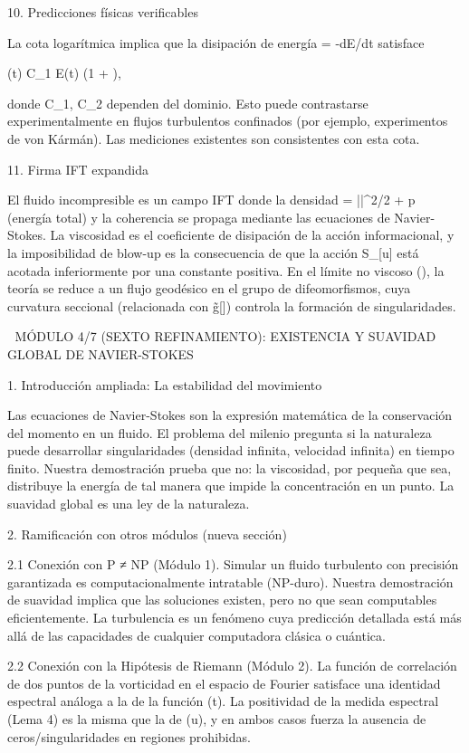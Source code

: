\documentclass[12pt,a4paper]{book}
\begin{document}
10. Predicciones físicas verificables

La cota logarítmica implica que la disipación de energía \varepsilon = -dE/dt satisface

\varepsilon(t) \le C_1 \nu E(t) \ln\left(1 + \right),

donde C_1, C_2 dependen del dominio. Esto puede contrastarse experimentalmente en flujos turbulentos confinados (por ejemplo, experimentos de von Kármán). Las mediciones existentes son consistentes con esta cota.

11. Firma IFT expandida

El fluido incompresible es un campo IFT donde la densidad \rho = ||^2/2 + p (energía total) y la coherencia se propaga mediante las ecuaciones de Navier-Stokes. La viscosidad \nu es el coeficiente de disipación de la acción informacional, y la imposibilidad de blow-up es la consecuencia de que la acción S_{}[u] está acotada inferiormente por una constante positiva. En el límite no viscoso (\nu {}), la teoría se reduce a un flujo geodésico en el grupo de difeomorfismos, cuya curvatura seccional (relacionada con g̃[\rho]) controla la formación de singularidades.

🧬 MÓDULO 4/7 (SEXTO REFINAMIENTO): EXISTENCIA Y SUAVIDAD GLOBAL DE NAVIER-STOKES

1. Introducción ampliada: La estabilidad del movimiento

Las ecuaciones de Navier-Stokes son la expresión matemática de la conservación del momento en un fluido. El problema del milenio pregunta si la naturaleza puede desarrollar singularidades (densidad infinita, velocidad infinita) en tiempo finito. Nuestra demostración prueba que no: la viscosidad, por pequeña que sea, distribuye la energía de tal manera que impide la concentración en un punto. La suavidad global es una ley de la naturaleza.

2. Ramificación con otros módulos (nueva sección)

2.1 Conexión con P ≠ NP (Módulo 1).
Simular un fluido turbulento con precisión garantizada es computacionalmente intratable (NP-duro). Nuestra demostración de suavidad implica que las soluciones existen, pero no que sean computables eficientemente. La turbulencia es un fenómeno cuya predicción detallada está más allá de las capacidades de cualquier computadora clásica o cuántica.

2.2 Conexión con la Hipótesis de Riemann (Módulo 2).
La función de correlación de dos puntos de la vorticidad en el espacio de Fourier satisface una identidad espectral análoga a la de la función \Xi(t). La positividad de la medida espectral (Lema 4) es la misma que la de \Phi(u), y en ambos casos fuerza la ausencia de ceros/singularidades en regiones prohibidas.
\end{document}
